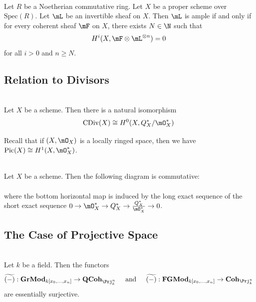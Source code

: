 \documentclass[a4paper]{article}
\begin{document}
\begin{prp}{}{}\\
Let $R$ be a Noetherian commutative ring. Let $X$ be a proper scheme over $\text{Spec}(R)$. Let $\mL$ be an invertible sheaf on $X$. Then $\mL$ is ample if and only if for every coherent sheaf $\mF$ on $X$, there exists $N\in\N$ such that $$H^i(X,\mF\otimes\mL^{\otimes n})=0$$ for all $i>0$ and $n\geq N$. 
\end{prp}

\subsection{Relation to Divisors}
\begin{lmm}{}{}\\
Let $X$ be a scheme. Then there is a natural isomorphism $$\text{CDiv}(X)\cong H^0(X,Q_X^\ast/\mO_X^\ast)$$
\end{lmm}

Recall that if $(X,\mO_X)$ is a locally ringed space, then we have $\text{Pic}(X)\cong H^1(X,\mO_X^\ast)$. 

\begin{prp}{}{}\\
Let $X$ be a scheme. Then the following diagram is commutative: \\
 \\
where the bottom horizontal map is induced by the long exact sequence of the short exact sequence $0\to\mO_X^\ast\to Q_X^\ast\to\frac{Q_X^\ast}{\mO_X^\ast}\to 0$. 
\end{prp}

\subsection{The Case of Projective Space}
\begin{prp}{}{}\\
Let $k$ be a field. Then the functors $$\widetilde{(-)}:\bold{GrMod}_{k[x_0,\dots,x_n]}\to\bold{QCoh}_{\Prj_k^n}\;\;\;\;\text{ and }\;\;\;\;\widetilde{(-)}:\bold{FGMod}_{k[x_0,\dots,x_n]}\to\bold{Coh}_{\Prj_k^n}$$ are essentially surjective. 
\end{prp}
\end{document}

